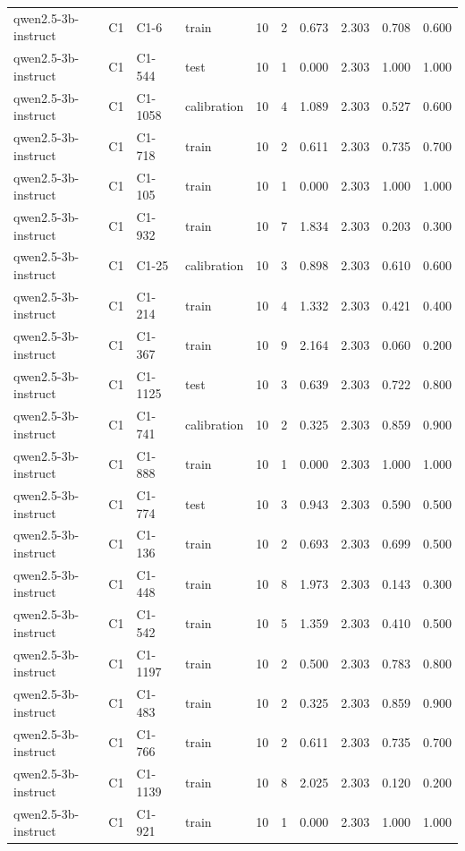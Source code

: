 \begin{table}
\begin{tabular}{llllrrrrrr}
qwen2.5-3b-instruct & C1 & C1-6 & train & 10 & 2 & 0.673 & 2.303 & 0.708 & 0.600 \\
qwen2.5-3b-instruct & C1 & C1-544 & test & 10 & 1 & 0.000 & 2.303 & 1.000 & 1.000 \\
qwen2.5-3b-instruct & C1 & C1-1058 & calibration & 10 & 4 & 1.089 & 2.303 & 0.527 & 0.600 \\
qwen2.5-3b-instruct & C1 & C1-718 & train & 10 & 2 & 0.611 & 2.303 & 0.735 & 0.700 \\
qwen2.5-3b-instruct & C1 & C1-105 & train & 10 & 1 & 0.000 & 2.303 & 1.000 & 1.000 \\
qwen2.5-3b-instruct & C1 & C1-932 & train & 10 & 7 & 1.834 & 2.303 & 0.203 & 0.300 \\
qwen2.5-3b-instruct & C1 & C1-25 & calibration & 10 & 3 & 0.898 & 2.303 & 0.610 & 0.600 \\
qwen2.5-3b-instruct & C1 & C1-214 & train & 10 & 4 & 1.332 & 2.303 & 0.421 & 0.400 \\
qwen2.5-3b-instruct & C1 & C1-367 & train & 10 & 9 & 2.164 & 2.303 & 0.060 & 0.200 \\
qwen2.5-3b-instruct & C1 & C1-1125 & test & 10 & 3 & 0.639 & 2.303 & 0.722 & 0.800 \\
qwen2.5-3b-instruct & C1 & C1-741 & calibration & 10 & 2 & 0.325 & 2.303 & 0.859 & 0.900 \\
qwen2.5-3b-instruct & C1 & C1-888 & train & 10 & 1 & 0.000 & 2.303 & 1.000 & 1.000 \\
qwen2.5-3b-instruct & C1 & C1-774 & test & 10 & 3 & 0.943 & 2.303 & 0.590 & 0.500 \\
qwen2.5-3b-instruct & C1 & C1-136 & train & 10 & 2 & 0.693 & 2.303 & 0.699 & 0.500 \\
qwen2.5-3b-instruct & C1 & C1-448 & train & 10 & 8 & 1.973 & 2.303 & 0.143 & 0.300 \\
qwen2.5-3b-instruct & C1 & C1-542 & train & 10 & 5 & 1.359 & 2.303 & 0.410 & 0.500 \\
qwen2.5-3b-instruct & C1 & C1-1197 & train & 10 & 2 & 0.500 & 2.303 & 0.783 & 0.800 \\
qwen2.5-3b-instruct & C1 & C1-483 & train & 10 & 2 & 0.325 & 2.303 & 0.859 & 0.900 \\
qwen2.5-3b-instruct & C1 & C1-766 & train & 10 & 2 & 0.611 & 2.303 & 0.735 & 0.700 \\
qwen2.5-3b-instruct & C1 & C1-1139 & train & 10 & 8 & 2.025 & 2.303 & 0.120 & 0.200 \\
qwen2.5-3b-instruct & C1 & C1-921 & train & 10 & 1 & 0.000 & 2.303 & 1.000 & 1.000 \\

\end{tabular}
\end{table}
